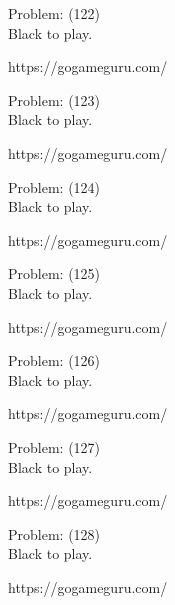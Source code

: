 \documentclass[11pt]{article}
\begin{document}
\begin{minipage}[t]{0.5\textwidth}
  {\centering
  
Problem: (122)\\
Black to play.

https://gogameguru.com/\\
  }
\end{minipage}
\begin{minipage}[t]{0.5\textwidth}
  {\centering
  
Problem: (123)\\
Black to play.

https://gogameguru.com/\\
  }
\end{minipage}
\begin{minipage}[t]{0.5\textwidth}
  {\centering
  
Problem: (124)\\
Black to play.

https://gogameguru.com/\\
  }
\end{minipage}
\begin{minipage}[t]{0.5\textwidth}
  {\centering
  
Problem: (125)\\
Black to play.

https://gogameguru.com/\\
  }
\end{minipage}
\begin{minipage}[t]{0.5\textwidth}
  {\centering
  
Problem: (126)\\
Black to play.

https://gogameguru.com/\\
  }
\end{minipage}
\begin{minipage}[t]{0.5\textwidth}
  {\centering
  
Problem: (127)\\
Black to play.

https://gogameguru.com/\\
  }
\end{minipage}
\begin{minipage}[t]{0.5\textwidth}
  {\centering
  
Problem: (128)\\
Black to play.

https://gogameguru.com/\\
  }
\end{minipage}
\end{document}
